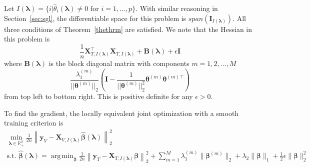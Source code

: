 \documentclass[12pt,letterpaper]{article}
\DeclareMathOperator*{\argmin}{arg\,min}
\begin{document}
Let $I(\boldsymbol \lambda) = \{i | \hat \theta_i(\boldsymbol \lambda) \ne 0  \text{ for } i=1,...,p \}$. With similar reasoning in Section~\ref{sec:sgl}, the differentiable space for this problem is $span(\boldsymbol I_{I(\boldsymbol \lambda)})$. All three conditions of Theorem~\ref{thethrm} are satisfied. We note that the Hessian in this problem is
\begin{equation}
\frac{1}{n} \boldsymbol X_{T, I(\boldsymbol \lambda)}^\top \boldsymbol X_{T, I(\boldsymbol \lambda)} + \boldsymbol B(\boldsymbol \lambda) + \epsilon \boldsymbol I
\end{equation}
where $\boldsymbol B(\boldsymbol \lambda)$ is the block diagonal matrix with components  $m=1,2,...,M$
\begin{equation}
\frac{\lambda_1^{(m)}}{|| \boldsymbol \theta^{(m)}||_2}
\left (
\boldsymbol I - 
\frac{1}{|| \boldsymbol \theta^{(m)}||_2^2} \boldsymbol \theta^{(m)} \boldsymbol \theta^{(m) \top}
\right )
\end{equation}
from top left to bottom right. This is positive definite for any $\epsilon > 0$.

To find the gradient, the locally equivalent joint optimization with a smooth training criterion is
\begin{equation}
\begin{array}{c}
\min_{\boldsymbol{\lambda} \in \mathbb{R}^2_{+}} \frac{1}{2n}
\left \| \boldsymbol{y}_V - \boldsymbol{X}_{V, I(\boldsymbol \lambda)} \hat{\boldsymbol{\beta}}(\boldsymbol{\lambda}) \right \|^2_2 \\
\text{s.t. }
\hat{\boldsymbol{\beta}}(\boldsymbol{\lambda}) =
\argmin_{\boldsymbol{\beta}} \frac{1}{2n} 
\left \| \boldsymbol{y}_T - \boldsymbol{X}_{T, I(\boldsymbol \lambda)} \boldsymbol{\beta} \right \|^2_2
+ \sum_{m=1}^M \lambda_1^{(m)} \| \boldsymbol\beta^{(m)} \|_2
+ \lambda_2 \| \boldsymbol\beta \|_1
+ \frac{1}{2} \epsilon \| \boldsymbol\beta \|_2^2
\end{array}
\end{equation}
\end{document}
